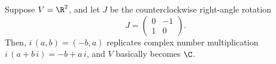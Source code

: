 \begin{example}
Suppose $V = \R^2$, and let $J$ be the counterclockwise right-angle rotation
\begin{equation*}
J = \begin{pmatrix}
    0 & -1\\
    1 & 0
\end{pmatrix}.
\end{equation*}
Then, $i \, (a, b) = (-b, a)$ replicates complex number multiplication $i \, (a + b \, i) = -b + a\, i$, and $V$ basically becomes $\C$.
\end{example}


\nocite{*}
\printbibliography

